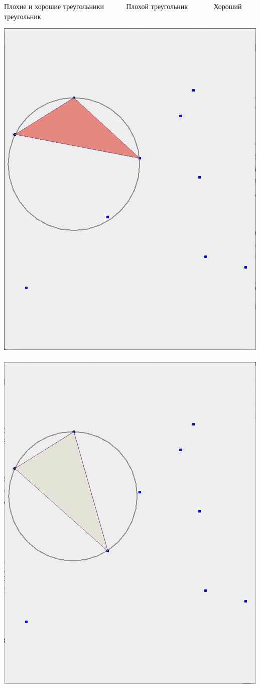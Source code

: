 \documentclass[14pt, fleqn, xcolor={dvipsnames, table}]{beamer}
\begin{document}
        \begin{frame}{Плохие и хорошие треугольники}
            ~~~~~ Плохой треугольник ~~~~~~ Хороший треугольник
            \begin{center}
	            \includegraphics[scale=0.3]{creep.png}~~\includegraphics[scale=0.3]{no-creep.png}

\end{center}
\end{frame}
\end{document}
